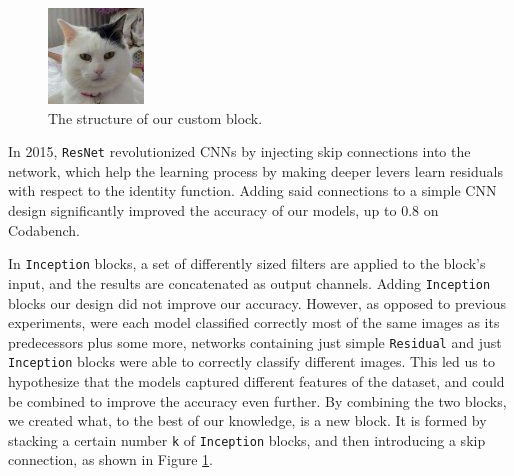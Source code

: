 \documentclass[11pt]{article}
\begin{document}
\begin{multicols}{2}
      \begin{figure}[H]
            \centering
            \includegraphics[width=0.75\linewidth]{custom_block.jpg}
            \caption{The structure of our custom block.}
            \label{fig:custom_block}
      \end{figure}

      In 2015, \texttt{ResNet} revolutionized CNNs by injecting skip connections into the network, which help the learning process by making deeper levers learn residuals with respect to the identity function. Adding said connections to a simple CNN design significantly improved the accuracy of our models, up to 0.8 on Codabench.

      In \texttt{Inception} blocks, a set of differently sized filters are applied to the block's input, and the results are concatenated as output channels. Adding \texttt{Inception} blocks our design did not improve our accuracy. However, as opposed to previous experiments, were each model classified correctly most of the same images as its predecessors plus some more, networks containing just simple \texttt{Residual} and just \texttt{Inception} blocks were able to correctly classify different images. This led us to hypothesize that the models captured different features of the dataset, and could be combined to improve the accuracy even further. By combining the two blocks, we created what, to the best of our knowledge, is a new block. It is formed by stacking a certain number \texttt{k} of \texttt{Inception} blocks, and then introducing a skip connection, as shown in Figure \ref{fig:custom_block}.


\end{multicols}
\end{document}
